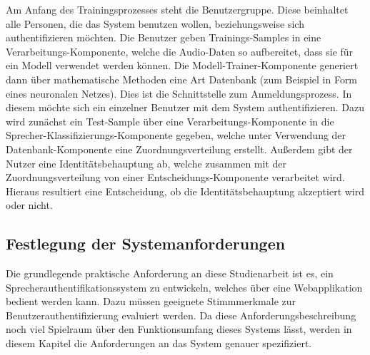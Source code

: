 Am Anfang des Trainingsprozesses steht die Benutzergruppe.
Diese beinhaltet alle Personen, die das System benutzen wollen, beziehungsweise sich authentifizieren möchten.
Die Benutzer geben Trainings-Samples in eine Verarbeitungs-Komponente, welche die Audio-Daten so aufbereitet, dass sie für ein Modell verwendet werden können.
Die Modell-Trainer-Komponente generiert dann über mathematische Methoden eine Art Datenbank (zum Beispiel in Form eines neuronalen Netzes).
Dies ist die Schnittstelle zum Anmeldungsprozess.
In diesem möchte sich ein einzelner Benutzer mit dem System authentifizieren.
Dazu wird zunächst ein Test-Sample über eine Verarbeitungs-Komponente in die Sprecher-Klassifizierungs-Komponente gegeben, welche unter Verwendung der Datenbank-Komponente eine Zuordnungsverteilung erstellt.
Außerdem gibt der Nutzer eine Identitätsbehauptung ab, welche zusammen mit der Zuordnungsverteilung von einer Entscheidungs-Komponente verarbeitet wird.
Hieraus resultiert eine Entscheidung, ob die Identitätsbehauptung akzeptiert wird oder nicht.

\textauthor{\vJB,}{\vLB}{}

\subsection{Festlegung der Systemanforderungen}\label{sec:anforderungen}

Die grundlegende praktische Anforderung an diese Studienarbeit ist es, ein Sprecherauthentifikationssystem zu entwickeln, welches über eine Webapplikation bedient werden kann.
Dazu müssen geeignete Stimmmerkmale zur Benutzerauthentifizierung evaluiert werden.
Da diese Anforderungsbeschreibung noch viel Spielraum über den Funktionsumfang dieses Systems lässt, werden in diesem Kapitel die Anforderungen an das System genauer spezifiziert.

